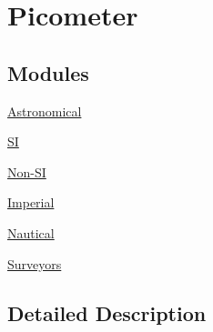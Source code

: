 \hypertarget{group___e_g_x_math-_conversions-_length_conversions-_picometer}{}\section{Picometer}
\label{group___e_g_x_math-_conversions-_length_conversions-_picometer}
\subsection*{Modules}
\begin{DoxyCompactItemize}
\item 
\mbox{\hyperlink{group___e_g_x_math-_conversions-_length_conversions-_picometer-_astronomical}{Astronomical}}
\item 
\mbox{\hyperlink{group___e_g_x_math-_conversions-_length_conversions-_picometer-_s_i}{SI}}
\item 
\mbox{\hyperlink{group___e_g_x_math-_conversions-_length_conversions-_picometer-_non-_s_i}{Non-\/\+SI}}
\item 
\mbox{\hyperlink{group___e_g_x_math-_conversions-_length_conversions-_picometer-_imperial}{Imperial}}
\item 
\mbox{\hyperlink{group___e_g_x_math-_conversions-_length_conversions-_picometer-_nautical}{Nautical}}
\item 
\mbox{\hyperlink{group___e_g_x_math-_conversions-_length_conversions-_picometer-_surveyors}{Surveyors}}
\end{DoxyCompactItemize}


\subsection{Detailed Description}
